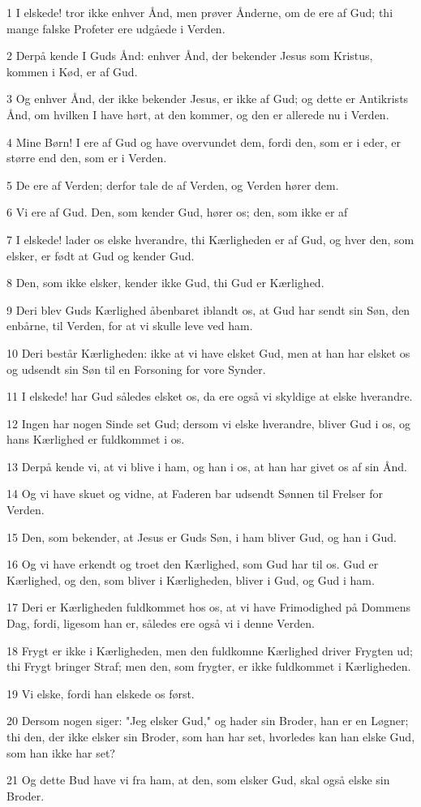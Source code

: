 \par 1 I elskede! tror ikke enhver Ånd, men prøver Ånderne, om de ere af Gud; thi mange falske Profeter ere udgåede i Verden.
\par 2 Derpå kende I Guds Ånd: enhver Ånd, der bekender Jesus som Kristus, kommen i Kød, er af Gud.
\par 3 Og enhver Ånd, der ikke bekender Jesus, er ikke af Gud; og dette er Antikrists Ånd, om hvilken I have hørt, at den kommer, og den er allerede nu i Verden.
\par 4 Mine Børn! I ere af Gud og have overvundet dem, fordi den, som er i eder, er større end den, som er i Verden.
\par 5 De ere af Verden; derfor tale de af Verden, og Verden hører dem.
\par 6 Vi ere af Gud. Den, som kender Gud, hører os; den, som ikke er af
\par 7 I elskede! lader os elske hverandre, thi Kærligheden er af Gud, og hver den, som elsker, er født at Gud og kender Gud.
\par 8 Den, som ikke elsker, kender ikke Gud, thi Gud er Kærlighed.
\par 9 Deri blev Guds Kærlighed åbenbaret iblandt os, at Gud har sendt sin Søn, den enbårne, til Verden, for at vi skulle leve ved ham.
\par 10 Deri består Kærligheden: ikke at vi have elsket Gud, men at han har elsket os og udsendt sin Søn til en Forsoning for vore Synder.
\par 11 I elskede! har Gud således elsket os, da ere også vi skyldige at elske hverandre.
\par 12 Ingen har nogen Sinde set Gud; dersom vi elske hverandre, bliver Gud i os, og hans Kærlighed er fuldkommet i os.
\par 13 Derpå kende vi, at vi blive i ham, og han i os, at han har givet os af sin Ånd.
\par 14 Og vi have skuet og vidne, at Faderen bar udsendt Sønnen til Frelser for Verden.
\par 15 Den, som bekender, at Jesus er Guds Søn, i ham bliver Gud, og han i Gud.
\par 16 Og vi have erkendt og troet den Kærlighed, som Gud har til os. Gud er Kærlighed, og den, som bliver i Kærligheden, bliver i Gud, og Gud i ham.
\par 17 Deri er Kærligheden fuldkommet hos os, at vi have Frimodighed på Dommens Dag, fordi, ligesom han er, således ere også vi i denne Verden.
\par 18 Frygt er ikke i Kærligheden, men den fuldkomne Kærlighed driver Frygten ud; thi Frygt bringer Straf; men den, som frygter, er ikke fuldkommet i Kærligheden.
\par 19 Vi elske, fordi han elskede os først.
\par 20 Dersom nogen siger: "Jeg elsker Gud," og hader sin Broder, han er en Løgner; thi den, der ikke elsker sin Broder, som han har set, hvorledes kan han elske Gud, som han ikke har set?
\par 21 Og dette Bud have vi fra ham, at den, som elsker Gud, skal også elske sin Broder.

